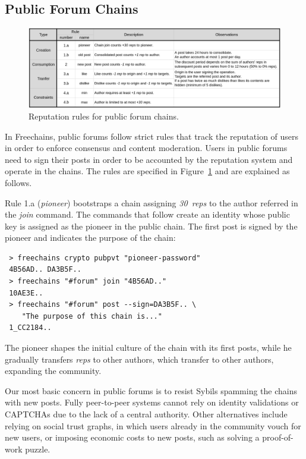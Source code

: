\documentclass[10pt,journal,compsoc]{IEEEtran}
\newcommand{\FC}        {Freechains\xspace}
\newcommand{\reps}      {\emph{reps}\xspace}
\newcommand{\nreps}[1]  {\emph{#1~reps\xspace}}
\newcommand{\nRule}[2]  {Rule {#1} (\emph{#2})}
\begin{document}
\subsection{Public Forum Chains}

\begin{figure}[ht]
\centering
\includegraphics[width=\textwidth]{rules.png}
\caption{Reputation rules for public forum chains.}
\label{fig.rules}
\end{figure}

In \FC, public forums follow strict rules that track the reputation of users in
order to enforce consensus and content moderation.
Users in public forums need to sign their posts in order to be accounted by the
reputation system and operate in the chains.
The rules are specified in Figure~\ref{fig.rules} and are explained as follows.

\nRule{1.a}{pioneer} bootstraps a chain assigning \nreps{30} to the author
referred in the \emph{join} command.
The commands that follow create an identity whose public key is assigned as the
pioneer in the public chain.
The first post is signed by the pioneer and indicates the purpose of the chain:

{\footnotesize
\begin{verbatim}
 > freechains crypto pubpvt "pioneer-password"
 4B56AD.. DA3B5F..
 > freechains "#forum" join "4B56AD.."
 10AE3E..
 > freechains "#forum" post --sign=DA3B5F.. \
    "The purpose of this chain is..."
 1_CC2184..
\end{verbatim}
}

The pioneer shapes the initial culture of the chain with its first posts, while
he gradually transfers \reps to other authors, which transfer to other authors,
expanding the community.

Our most basic concern in public forums is to resist Sybils spamming the chains
with new posts.
Fully peer-to-peer systems cannot rely on identity validations or CAPTCHAs due
to the lack of a central authority.
Other alternatives include relying on social trust graphs, in which users
already in the community vouch for new users, or imposing economic costs to new
posts, such as solving a proof-of-work puzzle.
\end{document}
